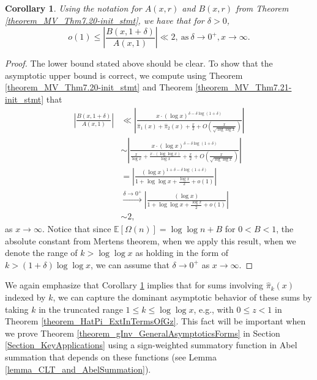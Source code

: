 \documentclass[11pt,reqno,a4letter]{article}
\numberwithin{figure}{section}
\numberwithin{table}{section}
\theoremstyle{plain}
\newtheorem{cor}[theorem]{Corollary}
\numberwithin{theorem}{section}
\theoremstyle{definition}
\begin{document}
\begin{cor} 
\label{theorem_MV_Thm7.20} 
Using the notation for $A(x, r)$ and $B(x, r)$ from 
Theorem \ref{theorem_MV_Thm7.20-init_stmt}, 
we have that for $\delta > 0$, 
\[
o(1) \leq \left\lvert \frac{B(x, 1+\delta)}{A(x, 1)} \right\rvert \ll 2, 
     \mathrm{\ as\ } \delta \rightarrow 0^{+}, x \rightarrow \infty. 
\]
\end{cor} 
\begin{proof} 
The lower bound stated above should be clear. To show that the asymptotic 
upper bound is correct, we compute using Theorem \ref{theorem_MV_Thm7.20-init_stmt} and 
Theorem \ref{theorem_MV_Thm7.21-init_stmt} that 
\begin{align*} 
\left\lvert \frac{B(x, 1+\delta)}{A(x, 1)} \right\rvert & \ll 
     \left\lvert \frac{x \cdot (\log x)^{\delta - \delta\log(1+\delta)}}{ 
     \widehat{\pi}_1(x) + \widehat{\pi}_2(x) + \frac{x}{2} + 
     O\left(\frac{x}{\sqrt{\log\log x}}\right)} \right\rvert \\ 
     & \sim 
     \left\lvert \frac{x \cdot (\log x)^{\delta - \delta\log(1+\delta)}}{ 
     \frac{x}{\log x} + \frac{x \cdot (\log\log x)}{\log x} + \frac{x}{2} + 
     O\left(\frac{x}{\sqrt{\log\log x}}\right)} \right\rvert \\ 
     & = 
     \left\lvert \frac{(\log x)^{1 + \delta - \delta\log(1+\delta)}}{ 
     1 + \log\log x + \frac{\log x}{2} + o(1)}\right\rvert \\ 
     & \xrightarrow{\delta \rightarrow 0^{+}} 
     \left\lvert \frac{(\log x)}{ 
     1 + \log\log x + \frac{\log x}{2} + o(1)} \right\rvert \\ 
     & \sim 2, 
\end{align*} 
as $x \rightarrow \infty$. Notice that since $\mathbb{E}[\Omega(n)] = \log\log n + B$ for $0 < B < 1$, the 
absolute constant from Mertens theorem, 
when we apply this result, when we denote the range of $k > \log\log x$ as holding in the form of 
$k > (1 + \delta) \log\log x$, we can assume that $\delta \rightarrow 0^{+}$ as 
$x \rightarrow \infty$. 
\end{proof} 

We again emphasize that 
Corollary \ref{theorem_MV_Thm7.20} implies that for sums involving $\widehat{\pi}_k(x)$ indexed by $k$, 
we can capture the dominant asymptotic behavior of these sums by taking $k$ in the truncated range 
$1 \leq k \leq \log\log x$, e.g., with $0 \leq z < 1$ in Theorem \ref{theorem_HatPi_ExtInTermsOfGz}. 
This fact will be important when we prove 
Theorem \ref{theorem_gInv_GeneralAsymptoticsForms} in 
Section \ref{Section_KeyApplications} using a sign-weighted 
summatory function in Abel summation that depends on these functions 
(see Lemma \ref{lemma_CLT_and_AbelSummation}). 
\end{document}
